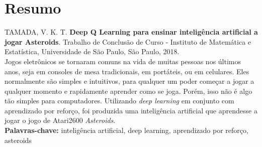 \chapter*{Resumo}
%
\noindent%
TAMADA, V. K. T. \textbf{Deep Q Learning para ensinar inteligência artificial a jogar Asteroids}. Trabalho de Conclusão de Curso
 - Instituto de Matemática e Estatística, Universidade de São Paulo,
São Paulo, 2018.
\\

Jogos eletrônicos se tornaram comuns na vida de muitas pessoas nos últimos anos, seja em consoles de mesa tradicionais, em portáteis, ou em celulares.
Eles normalmente são simples e intuitivos, para qualquer um poder começar a jogar a qualquer momento e rapidamente aprender como se joga.
Porém, isso não é algo tão simples para computadores.
Utilizando \textit{deep learning} em conjunto com aprendizado por reforço, foi produzida uma inteligência artificial que aprendesse a jogar o jogo de Atari2600 \textit{Asteroids}.
\\

\noindent%
\textbf{Palavras-chave:} inteligência artificial, deep learning, aprendizado por reforço, asteroids

%
%
